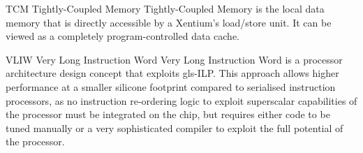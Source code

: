 %
  {TCM}%
  {Tightly-Coupled Memory}%
  {Tightly-Coupled Memory is the local data memory that is directly accessible %
   by a Xentium's load/store unit. It can be viewed as a completely %
   program-controlled data cache.}%



%
  {VLIW}%
  {Very Long Instruction Word}%
  {Very Long Instruction Word is a processor architecture design concept that
   exploits \gls{gls-ILP}. This approach allows higher performance at a smaller
   silicone footprint compared to serialised instruction processors, as no
   instruction re-ordering logic to exploit superscalar capabilities of the
   processor must be integrated on the chip, but requires either code to be
   tuned manually or a very sophisticated compiler to exploit the full potential
   of the processor.}%



\glsresetall
\makeglossaries
